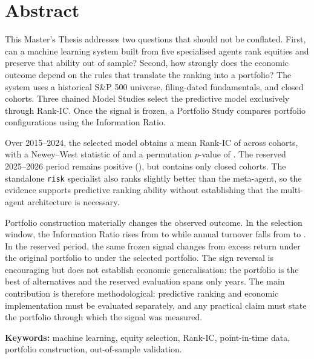 \chapter*{Abstract}

This Master's Thesis addresses two questions that should not be conflated. First, can a machine
learning system built from five specialised agents rank equities and preserve that ability out of
sample? Second, how strongly does the economic outcome depend on the rules that translate the
ranking into a portfolio? The system uses a historical S\&P 500 universe, filing-dated fundamentals,
and closed cohorts. Three chained Model Studies select the predictive model exclusively through
Rank-IC. Once the signal is frozen, a Portfolio Study compares \NumCarteras{} portfolio
configurations using the Information Ratio.

Over 2015--2024, the selected model obtains a mean Rank-IC of \RankICSeleccion{} across
\CohortesSeleccion{} cohorts, with a Newey--West statistic of \TNeweyWest{} and a permutation
$p$-value of \PValorPermutacion{}. The reserved 2025--2026 period remains positive
(\RankICReservado{}), but contains only \CohortesReservadas{} closed cohorts. The standalone
\texttt{risk} specialist also ranks slightly better than the meta-agent, so the evidence supports
predictive ranking ability without establishing that the multi-agent architecture is necessary.

Portfolio construction materially changes the observed outcome. In the selection window, the
Information Ratio rises from \IRModelo{} to \IRCartera{} while annual turnover falls from
\TurnoverModelo{} to \TurnoverCartera{}. In the reserved period, the same frozen signal changes
from \ExcesoModeloReservado{} excess return under the original portfolio to
\ExcesoCarteraReservado{} under the selected portfolio. The sign reversal is encouraging but does
not establish economic generalisation: the portfolio is the best of \NumCarteras{} alternatives and
the reserved evaluation spans only \AnosCarteraReservada{} years. The main contribution is therefore
methodological: predictive ranking and economic implementation must be evaluated separately, and
any practical claim must state the portfolio through which the signal was measured.

\noindent\textbf{Keywords:} machine learning, equity selection, Rank-IC, point-in-time data,
portfolio construction, out-of-sample validation.
